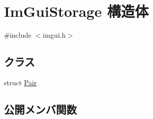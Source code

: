 \hypertarget{struct_im_gui_storage}{}\section{Im\+Gui\+Storage 構造体}
\label{struct_im_gui_storage}


{\ttfamily \#include $<$imgui.\+h$>$}

\subsection*{クラス}
\begin{DoxyCompactItemize}
\item 
struct \mbox{\hyperlink{struct_im_gui_storage_1_1_pair}{Pair}}
\end{DoxyCompactItemize}
\subsection*{公開メンバ関数}
